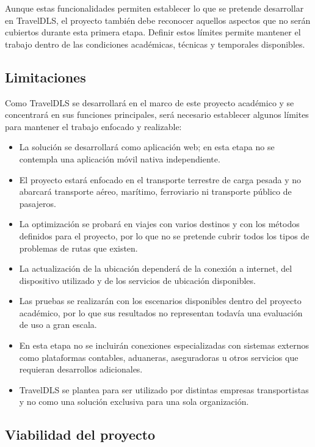 Aunque estas funcionalidades permiten establecer lo que se pretende desarrollar en TravelDLS, el proyecto también debe reconocer aquellos aspectos que no serán cubiertos durante esta primera etapa. Definir estos límites permite mantener el trabajo dentro de las condiciones académicas, técnicas y temporales disponibles.

\subsection{Limitaciones}
\label{sec:limitaciones}

Como TravelDLS se desarrollará en el marco de este proyecto académico y se concentrará en sus funciones principales, será necesario establecer algunos límites para mantener el trabajo enfocado y realizable:

\begin{itemize}
	\item La solución se desarrollará como aplicación web; en esta etapa no se contempla una aplicación móvil nativa independiente.
	\item El proyecto estará enfocado en el transporte terrestre de carga pesada y no abarcará transporte aéreo, marítimo, ferroviario ni transporte público de pasajeros.
	\item La optimización se probará en viajes con varios destinos y con los métodos definidos para el proyecto, por lo que no se pretende cubrir todos los tipos de problemas de rutas que existen.
	\item La actualización de la ubicación dependerá de la conexión a internet, del dispositivo utilizado y de los servicios de ubicación disponibles.
	\item Las pruebas se realizarán con los escenarios disponibles dentro del proyecto académico, por lo que sus resultados no representan todavía una evaluación de uso a gran escala.
	\item En esta etapa no se incluirán conexiones especializadas con sistemas externos como plataformas contables, aduaneras, aseguradoras u otros servicios que requieran desarrollos adicionales.
	\item TravelDLS se plantea para ser utilizado por distintas empresas transportistas y no como una solución exclusiva para una sola organización.
\end{itemize}

\subsection{Viabilidad del proyecto}
\label{sec:viabilidad}


